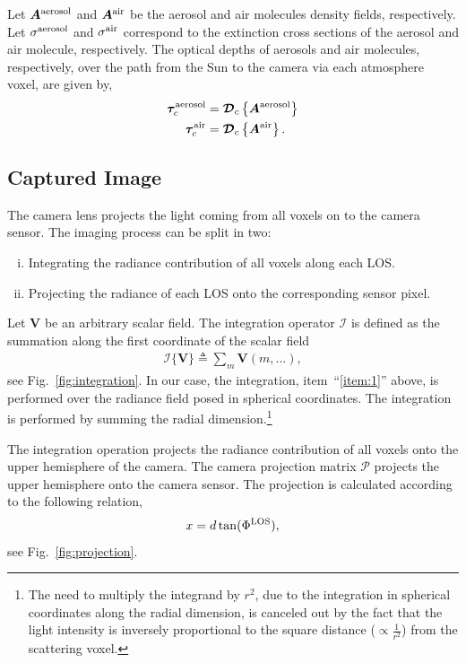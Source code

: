 \documentclass[10pt,twocolumn,letterpaper]{article}
\newcommand{\OpDistance}{\bm{\mathcal{D}}}
\newcommand{\OpInt}{\bm{\mathcal{I}}}
\newcommand{\OpCamera}{\bm{\mathcal{P}}}
\newcommand{\curly}[1]{\left\{#1\right\}}
\newcommand{\vect}[1]{\bm{#1}}
\newcommand{\mat}[1]{\bm{#1}}
\begin{document}
Let $\mat{A}^{\rm aerosol}$ and $\mat{A}^{\rm air}$ be the aerosol and
air molecules density fields, respectively.  Let $\sigma^{\rm
  aerosol}$ and $ \sigma^{\rm air}$ correspond to the extinction cross
sections of the aerosol and air molecule, respectively.  The optical
depths of aerosols and air molecules, respectively, over the path from
the Sun to the camera via each atmosphere voxel, are given by,
\begin{align}
  \vect{\tau}^{\rm aerosol}_c &= \OpDistance_c \curly{ \mat{A}^{\rm
      aerosol}} \nonumber \\
  \vect{\tau}^{\rm air}_c &= \OpDistance_c \curly{ \mat{A}^{\rm air}}.
  \label{eq:tau}
\end{align}

\subsection{Captured Image}
\label{sec:captured-image}

The camera lens projects the light coming from all voxels on to the
camera sensor. The imaging process can be split in two:
\begin{enumerate}[i.]
\item \label{item:1} Integrating the radiance contribution of all
  voxels along each LOS.
\item \label{item:2} Projecting the radiance of each LOS onto the
  corresponding sensor pixel.
\end{enumerate}
Let $\mat{V}$ be an arbitrary scalar field. The integration operator
$\OpInt$ is defined as the summation along the first coordinate of the
scalar field
\begin{align}
  \OpInt\{\mat{V}\} \triangleq \sum_m \mat{V}(m,...),
  \label{eq:operator_integral}
\end{align}
see Fig.~\ref{fig:integration}. In our case, the integration,
item~``\ref{item:1}'' above, is performed over the radiance field
posed in spherical coordinates. The integration is performed by
summing the radial dimension.\footnote{The need to multiply the
  integrand by $r^2$, due to the integration in spherical
  coordinates along the radial dimension, is canceled out by the
  fact that the light intensity is inversely proportional to the
  square distance ($\propto\frac{1}{r^2}$) from the scattering voxel.}

The integration operation projects the radiance contribution of all
voxels onto the upper hemisphere of the camera. The camera projection
matrix $\OpCamera$ projects the upper hemisphere onto the camera
sensor. The projection is calculated according to the following
relation,
\begin{align}
  x = d \tan(\Phi^{\rm LOS}),
\end{align}
see Fig.~\ref{fig:projection}.
\end{document}
